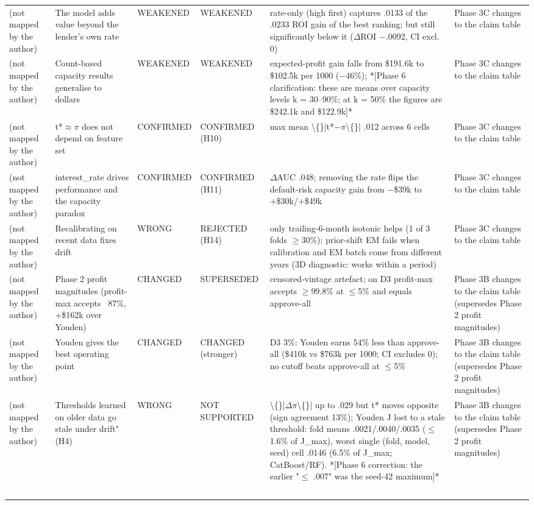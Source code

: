 \begin{tabular}{lp{5.2cm}lp{5.2cm}p{5.2cm}p{5.2cm}}
(not mapped by the author) & The model adds value beyond the lender's own rate & WEAKENED & WEAKENED & rate-only (high first) captures .0133 of the .0233 ROI gain of the best ranking; but still significantly below it ($\Delta$ROI $-$.0092, CI excl. 0) & Phase 3C changes to the claim table \\
(not mapped by the author) & Count-based capacity results generalise to dollars & WEAKENED & WEAKENED & expected-profit gain falls from \$191.6k to \$102.5k per 1000 ($-$46\%); *[Phase 6 clarification: these are means over capacity levels k = 30--90\%; at k = 50\% the figures are \$242.1k and \$122.9k]* & Phase 3C changes to the claim table \\
(not mapped by the author) & t*$\approx$$\pi$ does not depend on feature set & CONFIRMED & CONFIRMED (H10) & max mean \textbackslash\{\}|t*$-$$\pi$\textbackslash\{\}| .012 across 6 cells & Phase 3C changes to the claim table \\
(not mapped by the author) & interest\_rate drives performance and the capacity paradox & CONFIRMED & CONFIRMED (H11) & $\Delta$AUC .048; removing the rate flips the default-risk capacity gain from $-$\$39k to +\$30k/+\$49k & Phase 3C changes to the claim table \\
(not mapped by the author) & Recalibrating on recent data fixes drift & WRONG & REJECTED (H14) & only trailing-6-month isotonic helps (1 of 3 folds $\geq$30\%); prior-shift EM fails when calibration and EM batch come from different years (3D diagnostic: works within a period) & Phase 3C changes to the claim table \\
(not mapped by the author) & Phase 2 profit magnitudes (profit-max accepts ~87\%, +\$162k over Youden) & CHANGED & SUPERSEDED & censored-vintage artefact; on D3 profit-max accepts $\geq$99.8\% at $\leq$5\% and equals approve-all & Phase 3B changes to the claim table (supersedes Phase 2 profit magnitudes) \\
(not mapped by the author) & Youden gives the best operating point & CHANGED & CHANGED (stronger) & D3 3\%: Youden earns 54\% less than approve-all (\$410k vs \$763k per 1000; CI excludes 0); no cutoff beats approve-all at $\leq$5\% & Phase 3B changes to the claim table (supersedes Phase 2 profit magnitudes) \\
(not mapped by the author) & Thresholds learned on older data go stale under drift" (H4) & WRONG & NOT SUPPORTED & \textbackslash\{\}|$\Delta$$\pi$\textbackslash\{\}| up to .029 but t* moves opposite (sign agreement 13\%); Youden J lost to a stale threshold: fold means .0021/.0040/.0035 ($\leq$1.6\% of J\_max), worst single (fold, model, seed) cell .0146 (6.5\% of J\_max; CatBoost/RF). *[Phase 6 correction: the earlier "$\leq$ .007" was the seed-42 maximum]* & Phase 3B changes to the claim table (supersedes Phase 2 profit magnitudes) \\
$$
\end{tabular}

